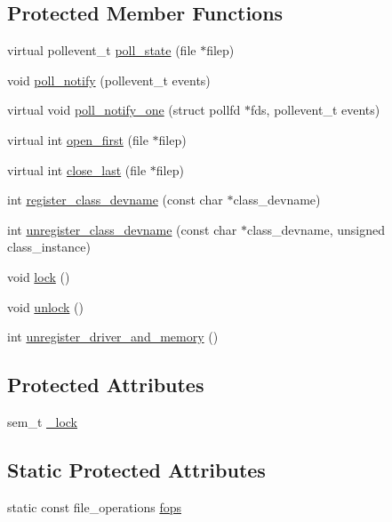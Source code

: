 \subsection*{Protected Member Functions}
\begin{DoxyCompactItemize}
\item 
virtual pollevent\+\_\+t \hyperlink{classcdev_1_1CDev_abf40a822665b0889584268e8a4dfbef2}{poll\+\_\+state} (file $\ast$filep)
\item 
void \hyperlink{classcdev_1_1CDev_aa23e0fac4d51f7b14db7a7e7dfa0ac06}{poll\+\_\+notify} (pollevent\+\_\+t events)
\item 
virtual void \hyperlink{classcdev_1_1CDev_ada35d652d0f6d7257fffe4ead0fbb6dd}{poll\+\_\+notify\+\_\+one} (struct pollfd $\ast$fds, pollevent\+\_\+t events)
\item 
virtual int \hyperlink{classcdev_1_1CDev_a89860de90cb8850c1ac71ec59764cf46}{open\+\_\+first} (file $\ast$filep)
\item 
virtual int \hyperlink{classcdev_1_1CDev_ae2fb43c7b0884dcbc6fbf1aa90d50a38}{close\+\_\+last} (file $\ast$filep)
\item 
int \hyperlink{classcdev_1_1CDev_a8cdc695d86a00139e11b2d57974475b4}{register\+\_\+class\+\_\+devname} (const char $\ast$class\+\_\+devname)
\item 
int \hyperlink{classcdev_1_1CDev_a84f73216813a23f91cd9414262484f3f}{unregister\+\_\+class\+\_\+devname} (const char $\ast$class\+\_\+devname, unsigned class\+\_\+instance)
\item 
void \hyperlink{classcdev_1_1CDev_ae676cccee31dd393ab681414a146d868}{lock} ()
\item 
void \hyperlink{classcdev_1_1CDev_af65273e0578b277deea057dc7d558e9d}{unlock} ()
\item 
int \hyperlink{classcdev_1_1CDev_a9fe9c784053bc2b7748db1ec405ae83f}{unregister\+\_\+driver\+\_\+and\+\_\+memory} ()
\end{DoxyCompactItemize}
\subsection*{Protected Attributes}
\begin{DoxyCompactItemize}
\item 
sem\+\_\+t \hyperlink{classcdev_1_1CDev_aa9b327dcb42b1160c01417ad64cd8e2b}{\+\_\+lock}
\end{DoxyCompactItemize}
\subsection*{Static Protected Attributes}
\begin{DoxyCompactItemize}
\item 
static const file\+\_\+operations \hyperlink{classcdev_1_1CDev_acb99fb0026b3466f200feef27046d612}{fops}
\end{DoxyCompactItemize}


